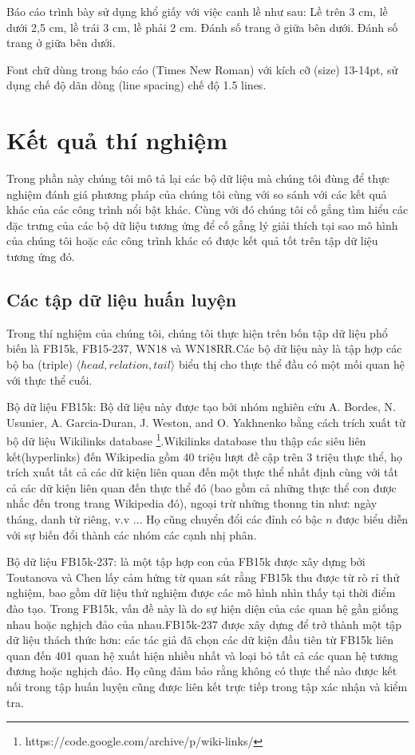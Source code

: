 
 Báo cáo trình bày sử dụng khổ giấy với việc canh lề như sau: Lề trên 3 cm, lề dưới 2,5 cm, lề trái 3 cm, lề phải 2 cm. Đánh số trang ở giữa bên dưới. Đánh số trang ở giữa bên dưới.

Font chữ dùng trong báo cáo (Times New Roman) với kích cỡ (size) 13-14pt, sử dụng chế độ dãn dòng (line spacing) chế độ 1.5 lines.


\section{Kết quả thí nghiệm}
Trong phần này chúng tôi mô tả lại các bộ dữ liệu mà chúng tôi đùng để thực nghiệm đánh giá phương pháp của chúng tôi cùng với so sánh với các kết quả khác của các công trình nổi bật khác. Cùng với đó chúng tôi cố gắng tìm hiểu các đặc trưng của các bộ dữ liệu tương ứng để cố gắng lý giải thích tại sao mô hình của chúng tôi hoặc các công trình khác có được kết quả tốt trên tập dữ liệu tương ứng đó.
\subsection{Các tập dữ liệu huấn luyện}
Trong thí nghiệm của chúng tôi, chúng tôi thực hiện trên bốn tập dữ liệu phổ biến là FB15k, FB15-237, WN18 và WN18RR.Các bộ dữ liệu này là tập hợp các bộ ba (triple) \(\langle head, relation, tail \rangle\) biểu thị cho thực thể đầu có một mối quan hệ với thực thể cuối.

Bộ dữ liệu FB15k: Bộ dữ liệu này được tạo bởi nhóm nghiên cứu A. Bordes, N. Usunier, A. Garcia-Duran, J. Weston, and O. Yakhnenko \cite{bordes2013translating} bằng cách trích xuất từ bộ dữ liệu Wikilinks database \footnote{https://code.google.com/archive/p/wiki-links/}.Wikilinks database thu thập các siêu liên kết(hyperlinks) đến Wikipedia gồm 40 triệu lượt đề cập trên 3 triệu thực thể, họ trích xuất tất cả các dữ kiện liên quan đến một thực thể nhất định cùng với tất cả các dữ kiện liên quan đến thực thể đó (bao gồm cả những thực thể con được nhắc đến trong trang Wikipedia đó), ngoại trừ những thonng tin như: ngày tháng, danh từ riêng, v.v ... Họ cũng chuyển đổi các đỉnh có bậc \(n\) được biểu diễn với sự biến đổi thành các nhóm các cạnh nhị phân.

Bộ dữ liệu FB15k-237: là một tập hợp con của FB15k được xây dựng bởi Toutanova và Chen \cite{toutanova2015observed} lấy cảm hứng từ quan sát rằng FB15k thu được từ rò rỉ thử nghiệm, bao gồm dữ liệu thử nghiệm được các mô hình nhìn thấy tại thời điểm đào tạo. Trong FB15k, vấn đề này là do sự hiện diện của các quan hệ gần giống nhau hoặc nghịch đảo của nhau.FB15k-237 được xây dựng để trở thành một tập dữ liệu thách thức hơn: các tác giả đã chọn các dữ kiện đầu tiên từ FB15k liên quan đến 401 quan hệ xuất hiện nhiều nhất và loại bỏ tất cả các quan hệ tương đương hoặc nghịch đảo. Họ cũng đảm bảo rằng không có thực thể nào được kết nối trong tập huấn luyện cũng được liên kết trực tiếp trong tập xác nhận và kiểm tra.

